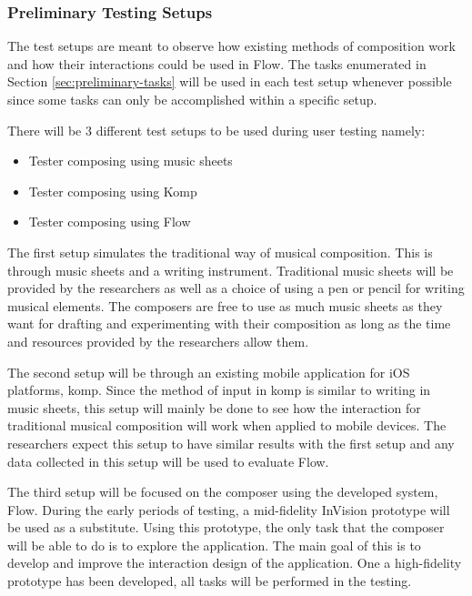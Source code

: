 			\subsubsection{Preliminary Testing Setups}

				The test setups are meant to observe how existing methods of composition work and how their interactions could be used in Flow. The tasks enumerated in Section \ref{sec:preliminary-tasks} will be used in each test setup whenever possible since some tasks can only be accomplished within a specific setup. 

				There will be 3 different test setups to be used during user testing namely:

				\begin{itemize}
					\item Tester composing using music sheets
					\item Tester composing using Komp
					\item Tester composing using Flow
				\end{itemize}

				The first setup simulates the traditional way of musical composition. This is through music sheets and a writing instrument. Traditional music sheets will be provided by the researchers as well as a choice of using a pen or pencil for writing musical elements. The composers are free to use as much music sheets as they want for drafting and experimenting with their composition as long as the time and resources provided by the researchers allow them.

				The second setup will be through an existing mobile application for iOS platforms, komp. Since the method of input in komp is similar to writing in music sheets, this setup will mainly be done to see how the interaction for traditional musical composition will work when applied to mobile devices. The researchers expect this setup to have similar results with the first setup and any data collected in this setup will be used to evaluate Flow.

				The third setup will be focused on the composer using the developed system, Flow. During the early periods of testing, a mid-fidelity InVision prototype will be used as a substitute. Using this prototype, the only task that the composer will be able to do is to explore the application. The main goal of this is to develop and improve the interaction design of the application. One a high-fidelity prototype has been developed, all tasks will be performed in the testing.

